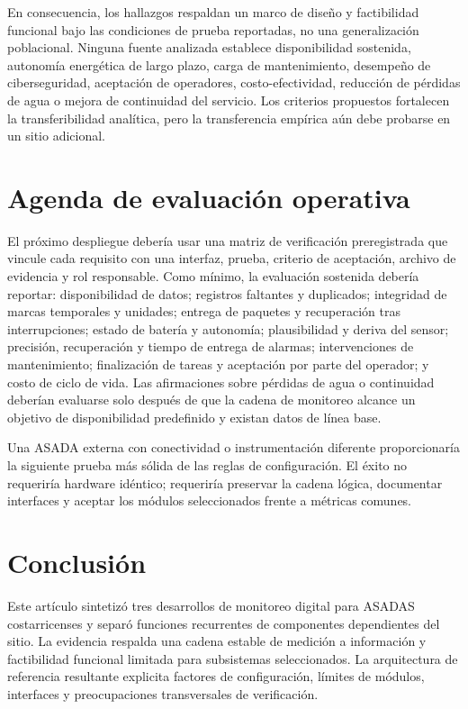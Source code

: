 \documentclass[conference]{IEEEtran}
\begin{document}
En consecuencia, los hallazgos respaldan un marco de diseño y factibilidad funcional bajo las condiciones de prueba reportadas, no una generalización poblacional. Ninguna fuente analizada establece disponibilidad sostenida, autonomía energética de largo plazo, carga de mantenimiento, desempeño de ciberseguridad, aceptación de operadores, costo-efectividad, reducción de pérdidas de agua o mejora de continuidad del servicio. Los criterios propuestos fortalecen la transferibilidad analítica, pero la transferencia empírica aún debe probarse en un sitio adicional.

\section{Agenda de evaluación operativa}

El próximo despliegue debería usar una matriz de verificación preregistrada que vincule cada requisito con una interfaz, prueba, criterio de aceptación, archivo de evidencia y rol responsable. Como mínimo, la evaluación sostenida debería reportar: disponibilidad de datos; registros faltantes y duplicados; integridad de marcas temporales y unidades; entrega de paquetes y recuperación tras interrupciones; estado de batería y autonomía; plausibilidad y deriva del sensor; precisión, recuperación y tiempo de entrega de alarmas; intervenciones de mantenimiento; finalización de tareas y aceptación por parte del operador; y costo de ciclo de vida. Las afirmaciones sobre pérdidas de agua o continuidad deberían evaluarse solo después de que la cadena de monitoreo alcance un objetivo de disponibilidad predefinido y existan datos de línea base.

Una ASADA externa con conectividad o instrumentación diferente proporcionaría la siguiente prueba más sólida de las reglas de configuración. El éxito no requeriría hardware idéntico; requeriría preservar la cadena lógica, documentar interfaces y aceptar los módulos seleccionados frente a métricas comunes.

\section{Conclusión}

Este artículo sintetizó tres desarrollos de monitoreo digital para ASADAS costarricenses y separó funciones recurrentes de componentes dependientes del sitio. La evidencia respalda una cadena estable de medición a información y factibilidad funcional limitada para subsistemas seleccionados. La arquitectura de referencia resultante explicita factores de configuración, límites de módulos, interfaces y preocupaciones transversales de verificación.
\end{document}
